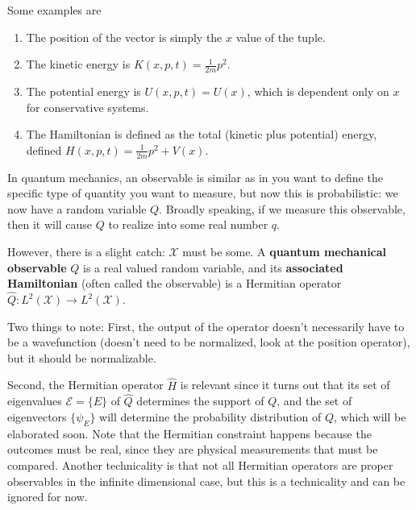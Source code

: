 \documentclass{article}
\begin{document}
  \begin{example}
    \label{ex:classical-observables-as-functions-of-position}
 
    Some examples are 
    \begin{enumerate} 
      \item The position of the vector is simply the $x$ value of the tuple. 
      \item The kinetic energy is $K(x, p, t) = \frac{1}{2m} p^2$. 
      \item The potential energy is $U(x, p, t) = U(x)$, which is dependent only on $x$ for conservative systems. 
      \item The Hamiltonian is defined as the total (kinetic plus potential) energy, defined $H(x, p, t) = \frac{1}{2m} p^2 + V(x)$. 
    \end{enumerate}
  \end{example}

  In quantum mechanics, an observable is similar as in you want to define the specific type of quantity you want to measure, but now this is probabilistic: we now have a random variable $Q$. Broadly speaking, if we measure this observable, then it will cause $Q$ to realize into some real number $q$. 

  \begin{definition}
    \label{def:observable-in-quantum-mechanics}
    However, there is a slight catch: $\mathcal{X}$ must be some. A \textbf{quantum mechanical observable} $Q$ is a real valued random variable, and its \textbf{associated Hamiltonian} (often called the observable) is a Hermitian operator $\hat{Q}: L^2 (\mathcal{X}) \rightarrow L^2 (\mathcal{X})$.  
  \end{definition}

  Two things to note: First, the output of the operator doesn't necessarily have to be a wavefunction (doesn't need to be normalized, look at the position operator), but it should be normalizable. 

  Second, the Hermitian operator $\hat{H}$ is relevant since it turns out that its set of eigenvalues $\mathcal{E} = \{E\}$ of $\hat{Q}$ determines the support of $Q$, and the set of eigenvectors $\{\psi_E\}$ will determine the probability distribution of $Q$, which will be elaborated soon. Note that the Hermitian constraint happens because the outcomes must be real, since they are physical measurements that must be compared. Another technicality is that not all Hermitian operators are proper observables in the infinite dimensional case, but this is a technicality and can be ignored for now.  
\end{document}
